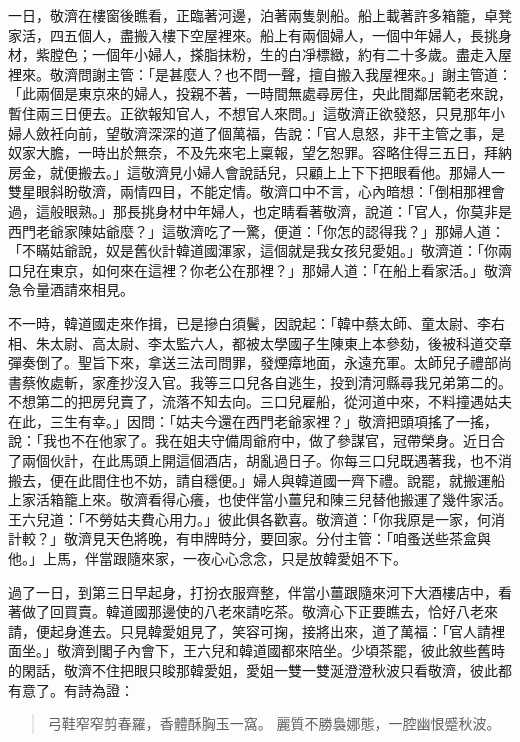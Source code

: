 一日，敬濟在樓窗後瞧看，正臨著河邊，泊著兩隻剝船。船上載著許多箱籠，卓凳家活，四五個人，盡搬入樓下空屋裡來。船上有兩個婦人，一個中年婦人，長挑身材，紫膛色；一個年小婦人，搽脂抹粉，生的白凈標緻，約有二十多歲。盡走入屋裡來。敬濟問謝主管：「是甚麼人？也不問一聲，擅自搬入我屋裡來。」謝主管道：「此兩個是東京來的婦人，投親不著，一時間無處尋房住，央此間鄰居範老來說，暫住兩三日便去。正欲報知官人，不想官人來問。」這敬濟正欲發怒，只見那年小婦人斂衽向前，望敬濟深深的道了個萬福，告說：「官人息怒，非干主管之事，是奴家大膽，一時出於無奈，不及先來宅上稟報，望乞恕罪。容略住得三五日，拜納房金，就便搬去。」這敬濟見小婦人會說話兒，只顧上上下下把眼看他。那婦人一雙星眼斜盼敬濟，兩情四目，不能定情。敬濟口中不言，心內暗想：「倒相那裡會過，這般眼熟。」那長挑身材中年婦人，也定睛看著敬濟，說道：「官人，你莫非是西門老爺家陳姑爺麼？」這敬濟吃了一驚，便道：「你怎的認得我？」那婦人道：「不瞞姑爺說，奴是舊伙計韓道國渾家，這個就是我女孩兒愛姐。」敬濟道：「你兩口兒在東京，如何來在這裡？你老公在那裡？」那婦人道：「在船上看家活。」敬濟急令量酒請來相見。

不一時，韓道國走來作揖，已是摻白須鬢，因說起：「韓中蔡太師、童太尉、李右相、朱太尉、高太尉、李太監六人，都被太學國子生陳東上本參劾，後被科道交章彈奏倒了。聖旨下來，拿送三法司問罪，發煙瘴地面，永遠充軍。太師兒子禮部尚書蔡攸處斬，家產抄沒入官。我等三口兒各自逃生，投到清河縣尋我兄弟第二的。不想第二的把房兒賣了，流落不知去向。三口兒雇船，從河道中來，不料撞遇姑夫在此，三生有幸。」因問：「姑夫今還在西門老爺家裡？」敬濟把頭項搖了一搖，說：「我也不在他家了。我在姐夫守備周爺府中，做了參謀官，冠帶榮身。近日合了兩個伙計，在此馬頭上開這個酒店，胡亂過日子。你每三口兒既遇著我，也不消搬去，便在此間住也不妨，請自穩便。」婦人與韓道國一齊下禮。說罷，就搬運船上家活箱籠上來。敬濟看得心癢，也使伴當小薑兒和陳三兒替他搬運了幾件家活。王六兒道：「不勞姑夫費心用力。」彼此俱各歡喜。敬濟道：「你我原是一家，何消計較？」敬濟見天色將晚，有申牌時分，要回家。分付主管：「咱蚤送些茶盒與他。」上馬，伴當跟隨來家，一夜心心念念，只是放韓愛姐不下。

過了一日，到第三日早起身，打扮衣服齊整，伴當小薑跟隨來河下大酒樓店中，看著做了回買賣。韓道國那邊使的八老來請吃茶。敬濟心下正要瞧去，恰好八老來請，便起身進去。只見韓愛姐見了，笑容可掬，接將出來，道了萬福：「官人請裡面坐。」敬濟到閣子內會下，王六兒和韓道國都來陪坐。少頃茶罷，彼此敘些舊時的閑話，敬濟不住把眼只睃那韓愛姐，愛姐一雙一雙涎澄澄秋波只看敬濟，彼此都有意了。有詩為證：
\begin{quote}
弓鞋窄窄剪春羅，香體酥胸玉一窩。
麗質不勝裊娜態，一腔幽恨蹙秋波。
\end{quote}

